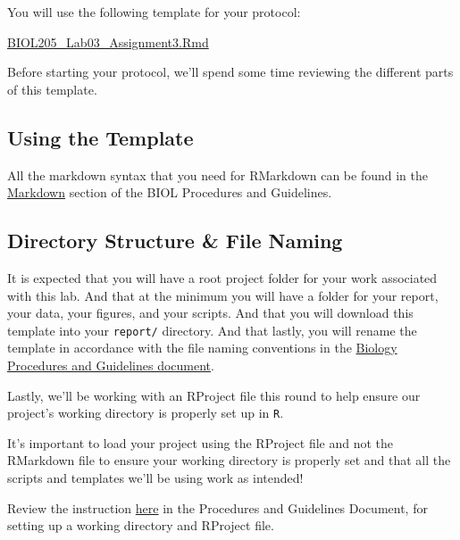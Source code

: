 \documentclass[
]{book}
\begin{document}
You will use the following template for your protocol:

\href{https://osf.io/download/qhc2v}{BIOL205\_Lab03\_Assignment3.Rmd}

Before starting your protocol, we'll spend some time reviewing the different parts of this template.

\hypertarget{using-the-template}{%
\subsection*{Using the Template}\label{using-the-template}}

All the markdown syntax that you need for RMarkdown can be found in the \href{https://ubco-biology.github.io/Procedures-and-Guidelines/markdown-1.html}{Markdown} section of the BIOL Procedures and Guidelines.

\hypertarget{directory-structure-file-naming}{%
\subsection*{Directory Structure \& File Naming}\label{directory-structure-file-naming}}

It is expected that you will have a root project folder for your work associated with this lab. And that at the minimum you will have a folder for your report, your data, your figures, and your scripts. And that you will download this template into your \texttt{report/} directory. And that lastly, you will rename the template in accordance with the file naming conventions in the \href{https://ubco-biology.github.io/Procedures-and-Guidelines/file-naming.html}{Biology Procedures and Guidelines document}.

Lastly, we'll be working with an RProject file this round to help ensure our project's working directory is properly set up in \texttt{R}.

It's important to load your project using the RProject file and not the RMarkdown file to ensure your working directory is properly set and that all the scripts and templates we'll be using work as intended!

Review the instruction \href{https://ubco-biology.github.io/Procedures-and-Guidelines/set-a-working-directory-in-rstudio.html}{here} in the Procedures and Guidelines Document, for setting up a working directory and RProject file.
\end{document}
